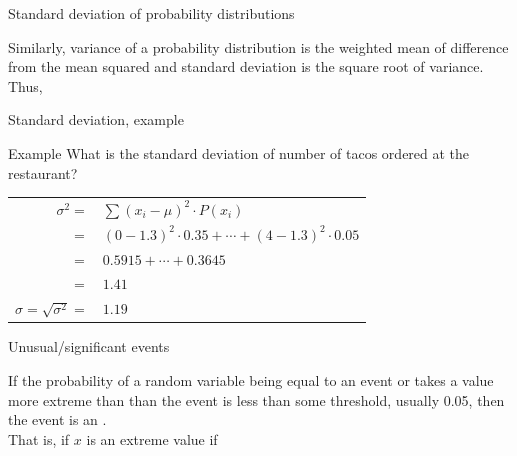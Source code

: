 \documentclass[xcolor=table, aspectratio=169, bigger]{beamer}
\begin{document}
\begin{frame}{Standard deviation of probability distributions}
\begin{block}{}
Similarly, variance of a probability distribution is the weighted mean of difference from the mean squared and standard deviation is the square root of variance.\\
\medskip
Thus, \\ \smallskip
{}
\end{block}
\end{frame}

\begin{frame}{Standard deviation, example}
\begin{exampleblock}{Example}
What is the standard deviation of number of tacos ordered at the restaurant?\\
\medskip
\pause
{\centering
\begin{tabular}{r l}
$\sigma^2 =$ & $\sum (x_i - \mu )^2 \cdot P(x_i)$\\
$=$ & $(0-1.3)^2 \cdot 0.35 + \cdots + (4-1.3)^2 \cdot 0.05$\\
$=$ & $0.5915 + \cdots + 0.3645$\\
$=$ & $1.41$\\
\pause$\sigma = \sqrt{\sigma^2} = $ & $1.19$
\end{tabular}\par
\renewcommand{\arraystretch}{1.5}}
\end{exampleblock}
\end{frame}


\begin{frame}{Unusual/significant events}
\begin{block}{}
If the probability of a random variable being equal to an event or takes a value more extreme than than the event is less than some threshold, usually 0.05, then the event is an .\\
\medskip
\pause
That is, if $x$ is an extreme value if\\ \medskip
{}
\medskip
\end{block}
\end{frame}
\end{document}
